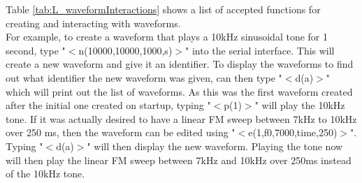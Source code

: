 Table \ref{tab:L_waveformInteractions} shows a list of accepted functions for creating and interacting with waveforms. \\

For example, to create a waveform that plays a 10kHz sinusoidal tone for 1 second, type "$<$n(10000,10000,1000,s)$>$" into the serial interface. This will create a new waveform and give it an identifier. To display the waveforms to find out what identifier the new waveform was given, can then type "$<$d(a)$>$" which will print out the list of waveforms. As this was the first waveform created after the initial one created on startup, typing "$<$p(1)$>$" will play the 10kHz tone. If it was actually desired to have a linear FM sweep between 7kHz to 10kHz over 250 ms, then the waveform can be edited using "$<$e(1,f0,7000,time,250)$>$". Typing "$<$d(a)$>$" will then display the new waveform. Playing the tone now will then play the linear FM sweep between 7kHz and 10kHz over 250ms instead of the 10kHz tone. \\
